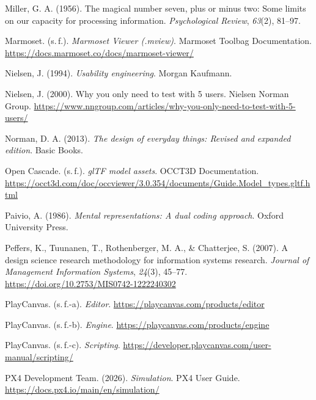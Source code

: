 \begin{list}{}
\item Miller, G. A. (1956). The magical number seven, plus or minus two: Some limits on our capacity for processing information. \textit{Psychological Review}, \textit{63}(2), 81--97.

\item Marmoset. (s.\,f.). \textit{Marmoset Viewer (.mview)}. Marmoset Toolbag Documentation. \url{https://docs.marmoset.co/docs/marmoset-viewer/}

\item Nielsen, J. (1994). \textit{Usability engineering}. Morgan Kaufmann.

\item Nielsen, J. (2000). Why you only need to test with 5 users. Nielsen Norman Group. \url{https://www.nngroup.com/articles/why-you-only-need-to-test-with-5-users/}

\item Norman, D. A. (2013). \textit{The design of everyday things: Revised and expanded edition}. Basic Books.

\item Open Cascade. (s.\,f.). \textit{glTF model assets}. OCCT3D Documentation. \url{https://occt3d.com/doc/occviewer/3.0.354/documents/Guide.Model_types.gltf.html}

\item Paivio, A. (1986). \textit{Mental representations: A dual coding approach}. Oxford University Press.

\item Peffers, K., Tuunanen, T., Rothenberger, M. A., \& Chatterjee, S. (2007). A design science research methodology for information systems research. \textit{Journal of Management Information Systems}, \textit{24}(3), 45--77. \url{https://doi.org/10.2753/MIS0742-1222240302}

\item PlayCanvas. (s.\,f.-a). \textit{Editor}. \url{https://playcanvas.com/products/editor}

\item PlayCanvas. (s.\,f.-b). \textit{Engine}. \url{https://playcanvas.com/products/engine}

\item PlayCanvas. (s.\,f.-c). \textit{Scripting}. \url{https://developer.playcanvas.com/user-manual/scripting/}

\item PX4 Development Team. (2026). \textit{Simulation}. PX4 User Guide. \url{https://docs.px4.io/main/en/simulation/}


\end{list}
